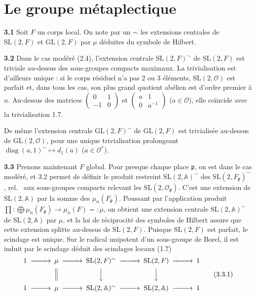 \documentclass[12pt,a4paper]{article}
\theoremstyle{plain}
\theoremstyle{definition}
\theoremstyle{remark}
\DeclareMathOperator{\diag}{diag}
\newcommand{\Af}{\mathbb{A}}
\newcommand{\cO}{\mathcal{O}}
\newcommand{\frakp}{\mathfrak{p}}
\providecommand{\cO}{\mathcal{O}}
\providecommand{\frakp}{\mathfrak{p}}
\begin{document}
\section{Le groupe métaplectique}

\textbf{3.1} Soit $F$ un corps local. On note par un $\sim$ les extensions centrales de $\mathrm{SL}(2, F)$ et $\mathrm{GL}(2, F)$ par $\mu$ déduites du symbole de Hilbert.

\textbf{3.2} Dans le cas modéré (2.4), l'extension centrale $\mathrm{SL}(2, F)^\sim$ de $\mathrm{SL}(2, F)$ est triviale au-dessus des sous-groupes compacts maximaux. La trivialisation est d'ailleurs unique : si le corps résiduel n'a pas 2 ou 3 éléments, $\mathrm{SL}(2, \cO)$ est parfait et, dans tous les cas, son plus grand quotient abélien est d'ordre premier à $n$. Au-dessus des matrices $\begin{pmatrix} 0 & 1 \\ -1 & 0 \end{pmatrix}$ et $\begin{pmatrix} a & 1 \\ 0 & a^{-1} \end{pmatrix}$ ($a \in \cO$), elle coïncide avec la trivialisation 1.7.

De même l'extension centrale $\mathrm{GL}(2, F)^\sim$ de $\mathrm{GL}(2, F)$ est trivialisée au-dessus de $\mathrm{GL}(2, \cO)$, pour une unique trivialisation prolongeant $\diag(a, 1)^\sim \mapsto d_1(a)$ ($a \in \cO^*$).

\textbf{3.3} Prenons maintenant $F$ global. Pour presque chaque place $\frakp$, on est dans le cas modéré, et 3.2 permet de définir le produit restreint $\mathrm{SL}(2, \Af)^\sim$ des $\mathrm{SL}(2, F_\frakp)^\sim$, rel.
\ aux sous-groupes compacts relevant les $\mathrm{SL}(2, \cO_\frakp)$. C'est une extension de $\mathrm{SL}(2, \Af)$ par la somme des $\mu_n(F_\frakp)$. Poussant par l'application produit $\prod : \bigoplus \mu_n(F_\frakp) \to \mu_n(F) =: \mu$, on obtient une extension centrale $\mathrm{SL}(2, \Af)^\sim$ de $\mathrm{SL}(2, \Af)$ par $\mu$, et la loi de réciprocité des symboles de Hilbert assure que cette extension splitte au-dessus de $\mathrm{SL}(2, F)$. Puisque $\mathrm{SL}(2, F)$ est parfait, le scindage est unique. Sur le radical unipotent d'un sous-groupe de Borel, il est induit par le scindage déduit des scindages locaux (1.7)
\[
\begin{CD}
1 @>>> \mu @>>> \mathrm{SL}(2, F)^\sim @>>> \mathrm{SL}(2, F) @>>> 1 \\
@. @| @VVV @VVV @. \\
1 @>>> \mu @>>> \mathrm{SL}(2, \Af)^\sim @>>> \mathrm{SL}(2, \Af) @>>> 1
\end{CD}
\tag{3.3.1}
\]
\end{document}
